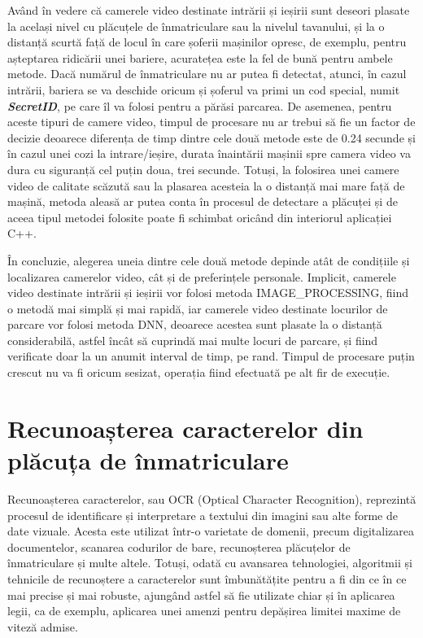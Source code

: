 \documentclass[12pt]{article}
\begin{document}
Av\^{a}nd \^{i}n vedere c\u{a} camerele video destinate intr\u{a}rii și ieșirii sunt deseori plasate la același nivel cu pl\u{a}cuțele de \^{i}nmatriculare sau la nivelul tavanului, și la o distanț\u{a} scurt\u{a} faț\u{a} de locul \^{i}n care șoferii mașinilor opresc, de exemplu, pentru așteptarea ridic\u{a}rii unei bariere, acuratețea este la fel de bun\u{a} pentru ambele metode. Dac\u{a} num\u{a}rul de \^{i}nmatriculare nu ar putea fi detectat, atunci, \^{i}n cazul intr\u{a}rii, bariera se va deschide oricum și șoferul va primi un cod special, numit \textbf{\textit{SecretID}}, pe care \^{i}l va folosi pentru a p\u{a}r\u{a}si parcarea. De asemenea, pentru aceste tipuri de camere video, timpul de procesare nu ar trebui s\u{a} fie un factor de decizie deoarece diferența de timp dintre cele dou\u{a} metode este de 0.24 secunde și \^{i}n cazul unei cozi la intrare/ieșire, durata \^{i}naint\u{a}rii mașinii spre camera video va dura cu siguranț\u{a} cel puțin doua, trei secunde. Totuși, la folosirea unei camere video de calitate sc\u{a}zut\u{a} sau la plasarea acesteia la o distanț\u{a} mai mare faț\u{a} de mașin\u{a}, metoda aleas\u{a} ar putea conta \^{i}n procesul de detectare a pl\u{a}cuței și de aceea tipul metodei folosite poate fi schimbat oric\^{a}nd din interiorul aplicației C++.

\^{I}n concluzie, alegerea uneia dintre cele dou\u{a} metode depinde at\^{a}t de condițiile și localizarea camerelor video, c\^{a}t și de preferințele personale. Implicit, camerele video destinate intr\u{a}rii și ieșirii vor folosi metoda IMAGE\_PROCESSING, fiind o metod\u{a} mai simpl\u{a} și mai rapid\u{a}, iar camerele video destinate locurilor de parcare vor folosi metoda DNN, deoarece acestea sunt plasate la o distanț\u{a} considerabil\u{a}, astfel \^{i}nc\^{a}t s\u{a} cuprind\u{a} mai multe locuri de parcare, și fiind verificate doar la un anumit interval de timp, pe rand. Timpul de procesare puțin crescut nu va fi oricum sesizat, operația fiind efectuat\u{a} pe alt fir de execuție.

\newpage
 
\section{Recunoașterea caracterelor din pl\u{a}cuța de \^{i}nmatriculare}

Recunoașterea caracterelor, sau OCR (Optical Character Recognition), reprezint\u{a} procesul de identificare și interpretare a textului din imagini sau alte forme de date vizuale. Acesta este utilizat \^{i}ntr-o varietate de domenii, precum digitalizarea documentelor, scanarea codurilor de bare, recunoșterea pl\u{a}cuțelor de \^{i}nmatriculare și multe altele. Totuși, odat\u{a} cu avansarea tehnologiei, algoritmii și tehnicile de recunoștere a caracterelor sunt \^{i}mbun\u{a}t\u{a}țite pentru a fi din ce \^{i}n ce mai precise și mai robuste, ajung\^{a}nd astfel s\u{a} fie utilizate chiar și \^{i}n aplicarea legii, ca de exemplu, aplicarea unei amenzi pentru dep\u{a}șirea limitei maxime de vitez\u{a} admise.
\end{document}
